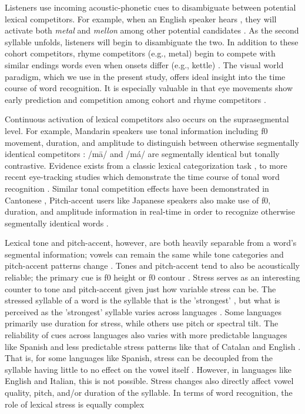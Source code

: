 Listeners use incoming acoustic-phonetic cues to disambiguate between potential lexical competitors. For example, when an English speaker hears , they will activate both \textit{metal} and \textit{mellon} among other potential candidates \citep{Marslen1980}. As the second syllable unfolds, listeners will begin to disambiguate the two. In addition to these cohort competitors, rhyme competitors (e.g., metal) begin to compete with similar endings words even when onsets differ (e.g., kettle) \citep{Allopenna_1998}. The visual world paradigm, which we use in the present study, offers ideal insight into the time course of word recognition. It is especially valuable in that eye movements show early prediction and competition among cohort and rhyme competitors \citep{Allopenna_1998}.

Continuous activation of lexical competitors also occurs on the suprasegmental level. For example, Mandarin speakers use tonal information including f0 movement, duration, and amplitude \cite[e.g.,][]{Zhang2022} to distinguish between otherwise segmentally identical competitors \cite{Lee2008}: /m\=a/ and /m\'a/ are segmentally identical but tonally contrastive. Evidence exists from a classic lexical categorization task \citep{fox_1985},  to more recent eye-tracking studies which demonstrate the time course of tonal word recognition \citep{zou_2022}. Similar tonal competition effects have been demonstrated in Cantonese \citep{qin_2022,Nixon2016}, Pitch-accent users like Japanese speakers also make use of f0, duration, and amplitude information in real-time in order to recognize otherwise segmentally identical words \citep{goss_2014,Cutler1999,Ito2024}.

Lexical tone and pitch-accent, however, are both heavily separable from a word's segmental information; vowels can remain the same while tone categories and pitch-accent patterns change \citep{Zeng2017}. Tones and pitch-accent tend to also be acoustically reliable; the primary cue is f0 height or f0 contour \citep{goss_2014}.  Stress serves as an interesting counter to tone and pitch-accent given just how variable stress can be. The stressed syllable of a word is the syllable that is the 'strongest' \citep{sluijter1996spectral}, but what is perceived as the 'strongest' syllable varies across languages \citep{Cutler1988}. Some languages primarily use duration for stress, while others use pitch or spectral tilt. The reliability of cues across languages also varies with more predictable languages like Spanish and less predictable stress patterns like that of Catalan and English \citep{ortega_2011, beckman_1994}. That is, for some languages like Spanish, stress can be decoupled from the syllable having little to no effect on the vowel itself \citep{ortega_2011}. However, in languages like English and Italian, this is not possible. Stress changes also directly affect vowel quality, pitch, and/or duration of the syllable. In terms of word recognition, the role of lexical stress is equally complex \citep{cutler2001voornaam,Reinisch2010}

